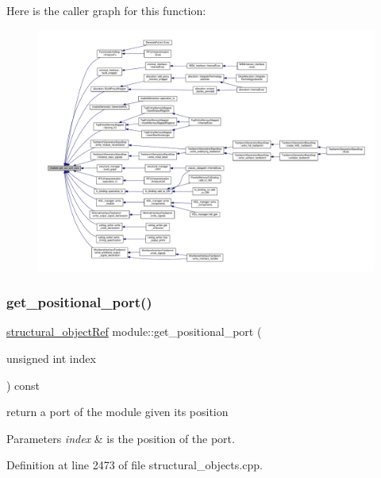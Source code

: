 Here is the caller graph for this function\+:
\nopagebreak
\begin{figure}[H]
\begin{center}
\leavevmode
\includegraphics[width=350pt]{d0/dd3/classmodule_af2b9fb284dad89d2d0a6d43d257ebd9e_icgraph}
\end{center}
\end{figure}
\mbox{\label{classmodule_afadd1842b848bde0a9893f4928029c2a}} 
\subsubsection{\texorpdfstring{get\+\_\+positional\+\_\+port()}{get\_positional\_port()}}
{\footnotesize\ttfamily \hyperlink{structural__objects_8hpp_a8ea5f8cc50ab8f4c31e2751074ff60b2}{structural\+\_\+object\+Ref} module\+::get\+\_\+positional\+\_\+port (\begin{DoxyParamCaption}\item[{unsigned int}]{index }\end{DoxyParamCaption}) const}



return a port of the module given its position 


\begin{DoxyParams}{Parameters}
{\em index} & is the position of the port. \\
\hline
\end{DoxyParams}


Definition at line 2473 of file structural\+\_\+objects.\+cpp.



